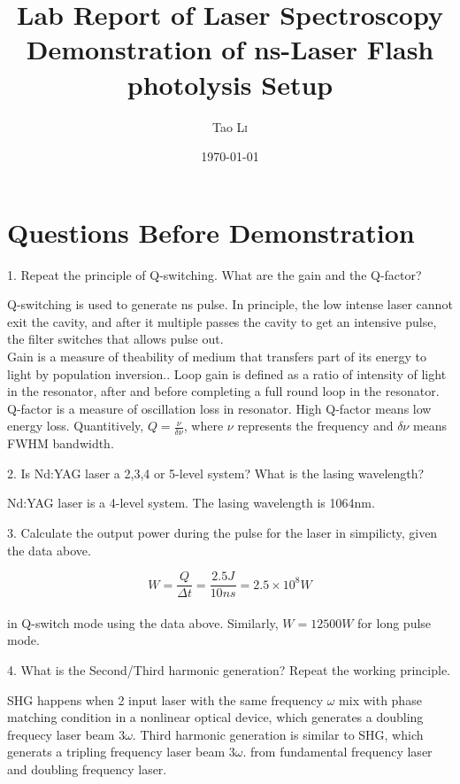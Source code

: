 \documentclass{article}
\title{Lab Report of Laser Spectroscopy \\ Demonstration of ns-Laser Flash photolysis Setup} %
\author{Tao \textsc{Li}} %
\date{\today} %
\begin{document}
\maketitle %



\section{Questions Before Demonstration}
1. Repeat the principle of Q-switching. What are the gain and the Q-factor?\par
Q-switching is used to generate ns pulse. In principle, the low intense laser cannot exit the cavity, and after it multiple passes the cavity to get an intensive pulse, the filter switches that allows pulse out.   \\
Gain is a measure of theability of medium that transfers part of its energy to light by population inversion.. Loop gain is defined as a ratio of intensity of light in the resonator, after and before completing a full round loop in the resonator. Q-factor is a measure of oscillation loss in resonator. High Q-factor means low energy loss. Quantitively, $Q=\frac{\nu}{\delta \nu}$, where $\nu$ represents the frequency and $\delta \nu$ means FWHM bandwidth.\\
\par
2. Is Nd:YAG laser a 2,3,4 or 5-level system? What is the lasing wavelength?\par 
Nd:YAG laser is a 4-level system. The lasing wavelength is 1064nm.\\
\par 
3. Calculate the output power during the pulse for the laser in simpilicty, given the data above. \par 
\begin{equation*}
W=\frac{Q}{\Delta t}=\frac{2.5J}{10ns}=2.5\times 10^8 W
\end{equation*} \\
in Q-switch mode using the data above. Similarly, $W=12500W$ for long pulse mode.
\par 
4. What is the Second/Third harmonic generation? Repeat the working principle.\par 
SHG happens when 2 input laser with the same frequency $\omega$ mix with phase matching condition in a nonlinear optical device, which generates a doubling frequecy laser beam $3\omega$. Third harmonic generation is similar to SHG, which generats a tripling frequency laser beam $3\omega$. from fundamental frequency laser and doubling frequency laser.\\
\end{document}
